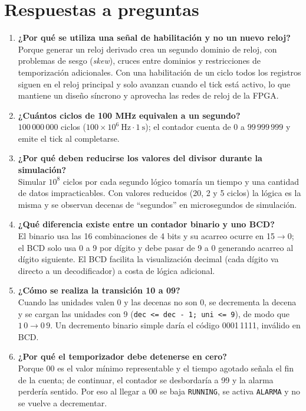 \documentclass[letterpaper,12pt]{article}
\begin{document}
\section{Respuestas a preguntas}
\begin{enumerate}
    \item \textbf{¿Por qué se utiliza una señal de habilitación y no un nuevo reloj?}\\
    Porque generar un reloj derivado crea un segundo dominio de reloj, con problemas de sesgo (\textit{skew}), cruces entre dominios y restricciones de temporización adicionales. Con una habilitación de un ciclo todos los registros siguen en el reloj principal y solo avanzan cuando el tick está activo, lo que mantiene un diseño síncrono y aprovecha las redes de reloj de la FPGA.

    \item \textbf{¿Cuántos ciclos de 100 MHz equivalen a un segundo?}\\
    $100\,000\,000$ ciclos ($100\times10^{6}\ \mathrm{Hz}\cdot1\ \mathrm{s}$); el contador cuenta de 0 a $99\,999\,999$ y emite el tick al completarse.

    \item \textbf{¿Por qué deben reducirse los valores del divisor durante la simulación?}\\
    Simular $10^{8}$ ciclos por cada segundo lógico tomaría un tiempo y una cantidad de datos impracticables. Con valores reducidos (20, 2 y 5 ciclos) la lógica es la misma y se observan decenas de ``segundos'' en microsegundos de simulación.

    \item \textbf{¿Qué diferencia existe entre un contador binario y uno BCD?}\\
    El binario usa las 16 combinaciones de 4 bits y su acarreo ocurre en 15$\to$0; el BCD solo usa 0 a 9 por dígito y debe pasar de 9 a 0 generando acarreo al dígito siguiente. El BCD facilita la visualización decimal (cada dígito va directo a un decodificador) a costa de lógica adicional.

    \item \textbf{¿Cómo se realiza la transición 10 a 09?}\\
    Cuando las unidades valen 0 y las decenas no son 0, se decrementa la decena y se cargan las unidades con 9 (\texttt{dec <= dec - 1; uni <= 9}), de modo que $1\,0\rightarrow0\,9$. Un decremento binario simple daría el código 0001\,1111, inválido en BCD.

    \item \textbf{¿Por qué el temporizador debe detenerse en cero?}\\
    Porque 00 es el valor mínimo representable y el tiempo agotado señala el fin de la cuenta; de continuar, el contador se desbordaría a 99 y la alarma perdería sentido. Por eso al llegar a 00 se baja \texttt{RUNNING}, se activa \texttt{ALARMA} y no se vuelve a decrementar.


\end{enumerate}
\end{document}
